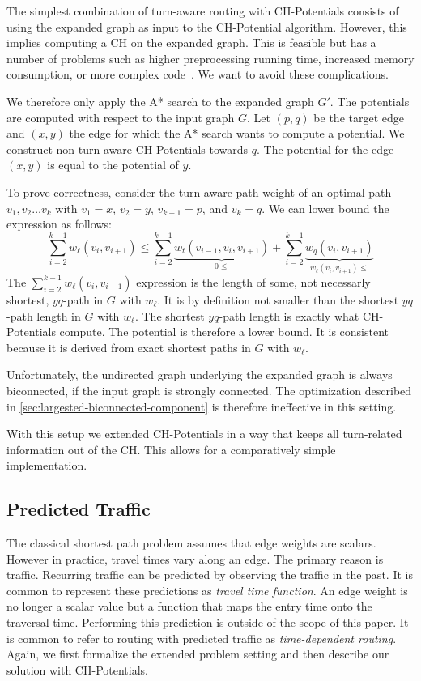 \documentclass[letterpaper]{article} %
\begin{document}
The simplest combination of turn-aware routing with CH-Potentials consists of using the expanded graph as input to the CH-Potential algorithm.
However, this implies computing a CH on the expanded graph.
This is feasible but has a number of problems such as higher preprocessing running time, increased memory consumption, or more complex code~\cite{geisberger-turn-table-paper}.
We want to avoid these complications.

We therefore only apply the A* search to the expanded graph $G'$. 
The potentials are computed with respect to the input graph $G$.
Let $(p,q)$ be the target edge and $(x,y)$ the edge for which the A* search wants to compute a potential.
We construct non-turn-aware CH-Potentials towards $q$.
The potential for the edge $(x,y)$ is equal to the potential of $y$.

To prove correctness, consider the turn-aware path weight of an optimal path $v_1,v_2\ldots v_k$ with $v_1=x$, $v_2=y$, $v_{k-1}=p$, and $v_k=q$.
We can lower bound the expression as follows:
\[
\sum_{i=2}^{k-1} w_\ell(v_i,v_{i+1}) \le \sum_{i=2}^{k-1} \underbrace{w_t(v_{i-1},v_i,v_{i+1})}_{0\le} + \sum_{i=2}^{k-1} \underbrace{w_q(v_i,v_{i+1})}_{w_\ell(v_i,v_{i+1})\le}
\]
The $\sum_{i=2}^{k-1} w_\ell(v_i,v_{i+1})$ expression is the length of some, not necessarly shortest, $yq$-path in $G$ with $w_\ell$.
It is by definition not smaller than the shortest $yq$-path length in $G$ with $w_\ell$.
The shortest $yq$-path length is exactly what CH-Potentials compute.
The potential is therefore a lower bound.
It is consistent because it is derived from exact shortest paths in $G$ with $w_\ell$.

Unfortunately, the undirected graph underlying the expanded graph is always biconnected, if the input graph is strongly connected.
The optimization described in \ref{sec:largested-biconnected-component} is therefore ineffective in this setting.

With this setup we extended CH-Potentials in a way that keeps all turn-related information out of the CH.
This allows for a comparatively simple implementation.

\subsection{Predicted Traffic}
\label{sec:predicted-traffic}

The classical shortest path problem assumes that edge weights are scalars. 
However in practice, travel times vary along an edge.
The primary reason is traffic.
Recurring traffic can be predicted by observing the traffic in the past.
It is common \cite{lots-of-td-papers} to represent these predictions as \emph{travel time function}.
An edge weight is no longer a scalar value but a function that maps the entry time onto the traversal time.
Performing this prediction is outside of the scope of this paper.
It is common to refer to routing with predicted traffic as \emph{time-dependent routing}.
Again, we first formalize the extended problem setting and then describe our solution with CH-Potentials.
\end{document}
